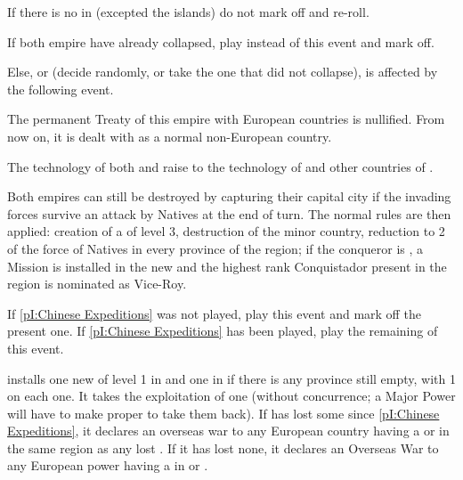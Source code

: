 

\condition{}
\aparag If there is no \COL in  (excepted the islands) do
not mark off and re-roll.

\aparag If both empire have already collapsed, play \RD instead of this event
and mark off.

\aparag Else, \paysInca or \paysAzteque (decide randomly, or take the one that
did not collapse), is affected by the following event.

\phevnt

\aparag The permanent Treaty of this empire with European countries is
nullified. From now on, it is dealt with as a normal non-European country.

\aparag The technology of both \paysInca and \paysAzteque raise to the
technology of \paysChine and other countries of \ROTW.

\aparag Both empires can still be destroyed by capturing their capital city if
the invading forces survive an attack by Natives at the end of turn. The
normal rules are then applied: creation of a \COL of level 3, destruction of
the minor country, reduction to 2 \DT of the force of Natives in every
province of the region; if the conqueror is \SPA, a Mission is installed in
the new \COL and the highest rank Conquistador present in the region is
nominated as Vice-Roy.





\condition{}
\aparag If \ref{pI:Chinese Expeditions} was not played, play this event and
mark off the present one.
\aparag If \ref{pI:Chinese Expeditions} has been played, play the remaining of
this event.

\phevnt
\aparag \paysChine installs one new \TP of level 1 in \granderegionFormose and
one in \granderegionPhilippines if there is any province still empty, with 1
\DT on each one. It takes the exploitation of one 
(without concurrence; a Major Power will have to make proper \CONC to take
them back).
\aparag If \paysChine has lost some \TP since \ref{pI:Chinese Expeditions}, it
declares an overseas war to any European country having a \TP or \COL in the
same region as any lost \TP. If it has lost none, it declares an Overseas War
to any European power having a \TP in \granderegionFormose or
\granderegionPhilippines.

